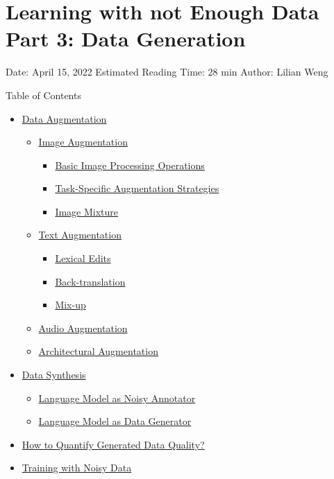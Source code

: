 \section{Learning with not Enough Data Part 3: Data Generation}\label{learning-with-not-enough-data-part-3-data-generation}

Date: April 15, 2022 \textbar{} Estimated Reading Time: 28 min \textbar{} Author: Lilian Weng

{Table of Contents}

\begin{itemize}
\tightlist
\item
  \hyperref[data-augmentation]{Data Augmentation}

  \begin{itemize}
  \tightlist
  \item
    \hyperref[image-augmentation]{Image Augmentation}

    \begin{itemize}
    \tightlist
    \item
      \hyperref[basic-image-processing-operations]{Basic Image Processing Operations}
    \item
      \hyperref[task-specific-augmentation-strategies]{Task-Specific Augmentation Strategies}
    \item
      \hyperref[image-mixture]{Image Mixture}
    \end{itemize}
  \item
    \hyperref[text-augmentation]{Text Augmentation}

    \begin{itemize}
    \tightlist
    \item
      \hyperref[lexical-edits]{Lexical Edits}
    \item
      \hyperref[back-translation]{Back-translation}
    \item
      \hyperref[mix-up]{Mix-up}
    \end{itemize}
  \item
    \hyperref[audio-augmentation]{Audio Augmentation}
  \item
    \hyperref[architectural-augmentation]{Architectural Augmentation}
  \end{itemize}
\item
  \hyperref[data-synthesis]{Data Synthesis}

  \begin{itemize}
  \tightlist
  \item
    \hyperref[language-model-as-noisy-annotator]{Language Model as Noisy Annotator}
  \item
    \hyperref[language-model-as-data-generator]{Language Model as Data Generator}
  \end{itemize}
\item
  \hyperref[how-to-quantify-generated-data-quality]{How to Quantify Generated Data Quality?}
\item
  \hyperref[training-with-noisy-data]{Training with Noisy Data}


\end{itemize}

